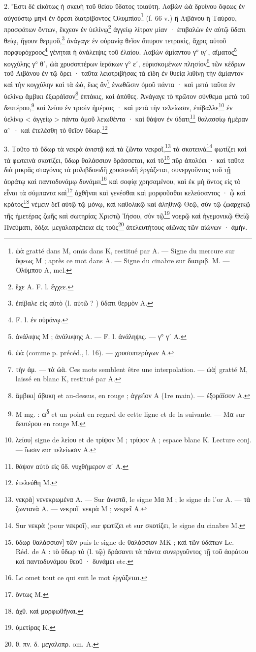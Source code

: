 \documentclass[a4paper, 11pt, oneside, polutonikogreek, french]{article}
\begin{document}
2. Ἔστι δὲ εἰκότως ἡ σκευὴ τοῦ θείου ὕδατος τοιαύτη. Λαβὼν ὠὰ δρυίνου ὄφεως ἐν αὐγούστῳ μηνὶ ἐν ὄρεσι διατρίβοντος Ὀλυμπίου\footnote{ὠὰ gratté dans M, omis dans K, restitué par A. --- Signe du mercure sur ὄφεως M ; après ce mot dans A. --- Signe du cinabre sur διατριβ. M. --- Ὀλύμπου A, mel.} (f. 66 v.) ἢ Λιβάνου ἢ Ταύρου, προσφάτων ὄντων, ἔκχεον ἐν ὑελίνῳ\footnote{ἔχε A. F. l. ἔγχεε.} ἀγγείῳ λίτραν μίαν · ἐπιβαλὼν ἐν αὐτῷ ὕδατι θείῳ, ἤγουν θερμοῦ,\footnote{ἐπίβαλε εἰς αὐτὸ (l. αὐτῶ ? ) ὕδατι θερμὸν A.} ἀνάγαγε ἐν οὐρανίᾳ θεῖον ἄπυρον τετρακὶς, ἄχρις αὐτοῦ πορφυρόχροος\footnote{F. l. ἐν οὐράνῳ.} γένηται ἡ ἀνάλειψις τοῦ ἐλαίου. Λαβὼν ἀμίαντου γ° ιγʹ, αἵματος\footnote{ἀνάλιψις M ; ἀνάλυψης A. --- F. l. ἀνάληψις. --- γ° γʹ A.} κογχύλης γ° θʹ, ὠὰ χρυσοπτέρων ἱεράκων γ° εʹ, εὑρισκομένων πλησίον\footnote{ὠὰ (comme p. précéd., l. 16). --- χρυσοπτερύγων A.} τῶν κέδρων τοῦ Λιβάνου ἐν τῷ ὄρει · ταῦτα λειοτριβήσας τὰ εἴδη ἐν θυείᾳ λιθίνῃ τὴν ἀμίαντον καὶ τὴν κογχύλην καὶ τὰ ὠὰ, ἕως ἂν\footnote{τὴν ἀμ. --- τὰ ὠὰ. Ces mots semblent être une interpolation. --- ὠὰ] gratté M, laissé en blanc K, restitué par A.} ἑνωθῶσιν ὁμοῦ πάντα · καὶ μετὰ ταῦτα ἐν ὑελίνῳ ἄμβικι ἐξωράϊσον\footnote{ἄμβικι] ἄβυκη et au-dessus, en rouge ; ἀγγεῖον A (1re main). --- ἐξοράϊσον A.} ἑπτάκις, καὶ ἀπόθες. Ἀνάγαγε τὸ πρῶτον σύνθεμα μετὰ τοῦ δευτέρου,\footnote{M mg. : ω\textsuperscript{δ} et un point en regard de cette ligne et de la suivante. --- Mα sur δευτέρου en rouge M.} καὶ λείου ἐν τρισὶν ἡμέραις · καὶ μετὰ τὴν τελείωσιν, ἐπίβαλλε\footnote{λείου] signe de λείου et de τρίψον M ; τρίψον A ; espace blanc K. Lecture conj. --- ἴωσιν sur τελείωσιν A.} ἐν ὑελίνῳ < ἀγγείῳ > πάντα ὁμοῦ λειωθέντα · καὶ θάψον ἐν ὕδατι\footnote{θάψον αὐτὸ εἰς ὕδ. νυχθήμερον αʹ A.} θαλασσίῳ ἡμέραν α` · καὶ ἐτελέσθη τὸ θεῖον ὕδωρ.\footnote{ἐτελεύθη M.}

3. Τοῦτο τὸ ὕδωρ τὰ νεκρὰ ἀνιστᾷ καὶ τὰ ζῶντα νεκροῖ,\footnote{νεκρὰ] νενεκρωμένα A. --- Sur ἀνιστᾶ, le signe Mα M ; le signe de l'or A. --- τὰ ζωντανὰ A. --- νεκροῖ] νεκρὰ M ; νεκρεῖ A.} τὰ σκοτεινὰ\footnote{Sur νεκρὰ (pour νεκροῖ), sur φωτίζει et sur σκοτίζει, le signe du cinabre M.} φωτίζει καὶ τὰ φωτεινὰ σκοτίζει, ὕδωρ θαλάσσιον δράσσεται, καὶ τὸ\footnote{ὕδωρ θαλάσσιον] τῶν puis le signe de θαλάσσιον MK ; καὶ τῶν ὑδάτων Lc. --- Réd. de A : τὸ ὕδωρ τὸ (l. τῷ) δράσαντι τὰ πάντα συνεργοῦντος τῇ τοῦ ἀοράτου καὶ παντοδυνάμου θεοῦ · δυνάμει etc.} πῦρ ἀπολύει · καὶ ταῦτα διὰ μικρᾶς σταγόνος τὰ μολιβδοειδῆ χρυσοειδῆ ἐργάζεται, συνεργοῦντος τοῦ τῇ ἀοράτῳ καὶ παντοδυνάμῳ δυνάμει\footnote{Lc omet tout ce qui suit le mot ἐργάζεται.} καὶ σοφίᾳ χρησαμένου, καὶ ἐκ μὴ ὄντος εἰς τὸ εἶναι τὰ σύμπαντα καὶ\footnote{ὄντως M.} ἀχθῆναι καὶ γενέσθαι καὶ μορφοῦσθαι κελεύσαντος · ᾧ καὶ κράτος\footnote{ἀχθ. καὶ μορφωθῆναι.} νέμειν δεῖ αὐτῷ τῷ μόνῳ, καὶ καθολικῷ καὶ ἀληθινῷ Θεῷ, σὺν τῷ ζωαρχικῷ τῆς ἡμετέρας ζωῆς καὶ σωτηρίας Χριστῷ Ἰήσου, σὺν τῷ\footnote{ὑμετίρας K.} νοερῷ καὶ ἡγεμονικῷ Θείῷ Πνεύματι, δόξα, μεγαλοπρέπεια εἰς τοὺς\footnote{θ. πν. δ. μεγαλοπρ. om. A.} ἀτελευτήτους αἰῶνας τῶν αἰώνων · ἀμήν.
\end{document}
